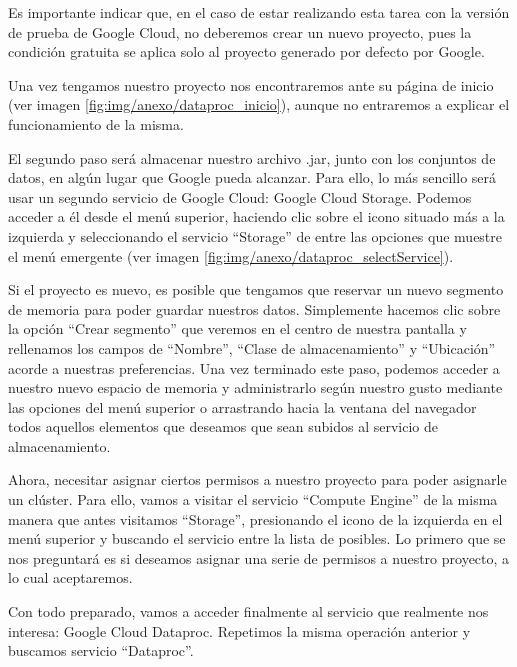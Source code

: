 
Es importante indicar que, en el caso de estar realizando esta tarea con la versión de prueba de Google Cloud, no deberemos crear un nuevo proyecto, pues la condición gratuita se aplica solo al proyecto generado por defecto por Google.

Una vez tengamos nuestro proyecto nos encontraremos ante su página de inicio (ver imagen \ref{fig:img/anexo/dataproc_inicio}), aunque no entraremos a explicar el funcionamiento de la misma.


El segundo paso será almacenar nuestro archivo .jar, junto con los conjuntos de datos, en algún lugar que Google pueda alcanzar. Para ello, lo más sencillo será usar un segundo servicio de Google Cloud: Google Cloud Storage. Podemos acceder a él desde el menú superior, haciendo clic sobre el icono situado más a la izquierda y seleccionando el servicio ``Storage'' de entre las opciones que muestre el menú emergente (ver imagen \ref{fig:img/anexo/dataproc_selectService}).


Si el proyecto es nuevo, es posible que tengamos que reservar un nuevo segmento de memoria para poder guardar nuestros datos. Simplemente hacemos clic sobre la opción ``Crear segmento'' que veremos en el centro de nuestra pantalla y rellenamos los campos de ``Nombre'', ``Clase de almacenamiento'' y ``Ubicación'' acorde a nuestras preferencias. Una vez terminado este paso, podemos acceder a nuestro nuevo espacio de memoria y administrarlo según nuestro gusto mediante las opciones del menú superior o arrastrando hacia la ventana del navegador todos aquellos elementos que deseamos que sean subidos al servicio de almacenamiento.

Ahora, necesitar asignar ciertos permisos a nuestro proyecto para poder asignarle un clúster. Para ello, vamos a visitar el servicio ``Compute Engine'' de la misma manera que antes visitamos ``Storage'', presionando el icono de la izquierda en el menú superior y buscando el servicio entre la lista de posibles. Lo primero que se nos preguntará es si deseamos asignar una serie de permisos a nuestro proyecto, a lo cual aceptaremos.

Con todo preparado, vamos a acceder finalmente al servicio que realmente nos interesa: Google Cloud Dataproc. Repetimos la misma operación anterior y buscamos servicio ``Dataproc''.

